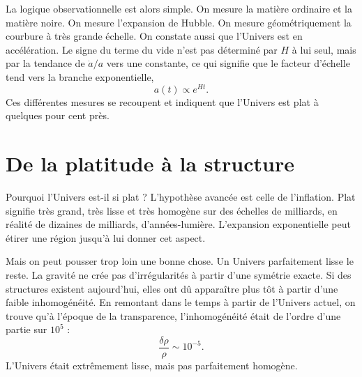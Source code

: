 La logique observationnelle est alors simple. On mesure la matière ordinaire et la matière noire. On mesure l’expansion de Hubble. On mesure géométriquement la courbure à très grande échelle. On constate aussi que l’Univers est en accélération. Le signe du terme du vide n’est pas déterminé par \(H\) à lui seul, mais par la tendance de \(\dot a/a\) vers une constante, ce qui signifie que le facteur d’échelle tend vers la branche exponentielle,
\begin{equation}
a(t)\propto e^{Ht}.
\end{equation}
Ces différentes mesures se recoupent et indiquent que l’Univers est plat à quelques pour cent près.

\begin{classroomqa}
\end{classroomqa}

\begin{classroomqa}
\end{classroomqa}

\section{De la platitude à la structure}

Pourquoi l’Univers est-il si plat ? L’hypothèse avancée est celle de l’inflation. Plat signifie très grand, très lisse et très homogène sur des échelles de milliards, en réalité de dizaines de milliards, d’années-lumière. L’expansion exponentielle peut étirer une région jusqu’à lui donner cet aspect.

Mais on peut pousser trop loin une bonne chose. Un Univers parfaitement lisse le reste. La gravité ne crée pas d’irrégularités à partir d’une symétrie exacte. Si des structures existent aujourd’hui, elles ont dû apparaître plus tôt à partir d’une faible inhomogénéité. En remontant dans le temps à partir de l’Univers actuel, on trouve qu’à l’époque de la transparence, l’inhomogénéité était de l’ordre d’une partie sur \(10^5\) :
\begin{equation}
\frac{\delta\rho}{\rho}\sim 10^{-5}.
\end{equation}
L’Univers était extrêmement lisse, mais pas parfaitement homogène.

